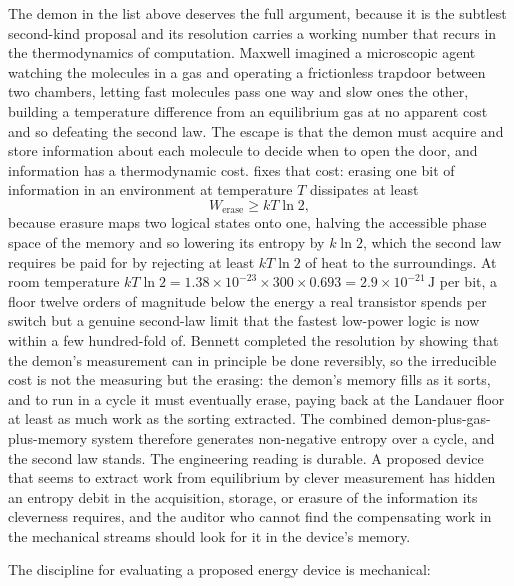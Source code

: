 The demon in the list above deserves the full argument, because it is the
subtlest second-kind proposal and its resolution carries a working number that
recurs in the thermodynamics of computation. Maxwell imagined a microscopic agent
watching the molecules in a gas and operating a frictionless trapdoor between two
chambers, letting fast molecules pass one way and slow ones the other, building a
temperature difference from an equilibrium gas at no apparent cost and so
defeating the second law. The escape is that the demon must acquire and store
information about each molecule to decide when to open the door, and information
has a thermodynamic cost.  fixes that cost: erasing
one bit of information in an environment at temperature $T$ dissipates at least
\[
W_{\text{erase}} \geq k T \ln 2,
\]
because erasure maps two logical states onto one, halving the accessible phase
space of the memory and so lowering its entropy by $k\ln 2$, which the second law
requires be paid for by rejecting at least $kT\ln 2$ of heat to the surroundings.
At room temperature $kT\ln 2 = 1.38\times 10^{-23} \times 300 \times 0.693 =
2.9\times 10^{-21}\,\text{J}$ per bit, a floor twelve orders of magnitude below
the energy a real transistor spends per switch but a genuine second-law limit
that the fastest low-power logic is now within a few hundred-fold of. Bennett
completed the resolution by showing that the demon's measurement can in principle
be done reversibly, so the irreducible cost is not the measuring but the erasing:
the demon's memory fills as it sorts, and to run in a cycle it must eventually
erase, paying back at the Landauer floor at least as much work as the sorting
extracted. The combined demon-plus-gas-plus-memory system therefore generates
non-negative entropy over a cycle, and the second law stands. The engineering
reading is durable. A proposed device that seems to extract work from equilibrium
by clever measurement has hidden an entropy debit in the acquisition, storage, or
erasure of the information its cleverness requires, and the auditor who cannot
find the compensating work in the mechanical streams should look for it in the
device's memory.

The discipline for evaluating a proposed energy device is mechanical:

